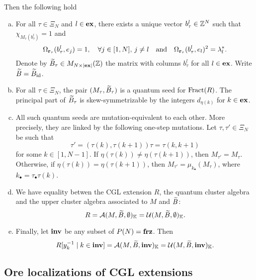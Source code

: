 \begin{theorem}
	Then the following hold
	\begin{enumerate}[(a)]
		\item For all $\tau \in \Xi_N$ and $l \in \mathbf{ex}$, there exists a unique vector $b^l_{\tau}\in
			      \mathbb{Z}^N$ such that $\chi_{M_\tau (b^l_\tau)} = 1$ and
		      \begin{equation*}
			      \Omega_{\mathbf{r}_\tau}(b^l_\tau, e_j) = 1, \quad \forall j\in [1, N],\,j\neq l \quad \text{and} \quad \Omega_{\mathbf{r}_\tau}(b^l_{\tau}, e_l)^2 = \lambda_l^*.
		      \end{equation*}
		      Denote by $\widetilde{B}_\tau \in M_{N \times |\mathbf{ex}|}(\mathbb{Z})$ the matrix with columns $b^l_\tau$
		      for all $l \in \mathbf{ex}$. Write $\widetilde{B} = \widetilde{B}_{\operatorname{id}}$.
		\item For all $\tau \in \Xi_N$, the pair $(M_\tau, \widetilde{B}_\tau)$ is a quantum seed for
		      $\operatorname{Fract}(R)$. The principal part of $\widetilde{B}_\tau$ is skew-symmetrizable by the integers
		      $d_{\eta(k)}$ for $k \in \mathbf{ex}$.
		\item All such quantum seeds are mutation-equivalent to each other. More precisely, they are
		      linked by the following one-step mutations. Let $\tau, \tau' \in \Xi_N$ be such that
		      \begin{equation*}
			      \tau' = (\tau(k), \tau(k+1))\tau = \tau (k, k+1)
		      \end{equation*}
		      for some $k\in [1, N-1]$. If $\eta(\tau(k)) \neq \eta(\tau(k+1))$, then $M_{\tau'} = M_\tau$. Otherwise, if $\eta(\tau(k)) = \eta(\tau(k+1))$, then $M_{\tau'} = \mu_{k_\bullet}(M_\tau)$, where $k_\bullet = \tau_\bullet \tau(k)$.
		\item We have equality betwen the CGL extension $R$, the quantum cluster algebra and the
		      upper cluster algebra associated to $M$ and $\widetilde{B}$:
		      \begin{equation*}
			      R = \mathcal{A}(M, \widetilde{B}, \emptyset)_{\mathbb{K}} = \mathcal{U}(M, \widetilde{B}, \emptyset)_{\mathbb{K}}.
		      \end{equation*}
		\item Finally, let $\mathbf{inv}$ be any subset of $P(N) = \mathbf{frz}$. Then
		      \begin{equation*}
			      R[y_k^{-1} \mid k \in \mathbf{inv}] = \mathcal{A}(M, \widetilde{B}, \mathbf{inv})_{\mathbb{K}} = \mathcal{U}(M, \widetilde{B}, \mathbf{inv})_{\mathbb{K}}.
		      \end{equation*}
	\end{enumerate}
\end{theorem}

\subsection{Ore localizations of CGL extensions}

